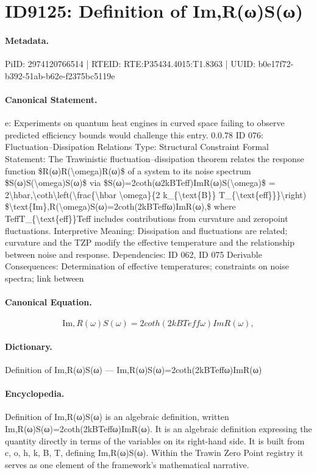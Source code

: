 \section*{ID9125: Definition of Im,R(ω)S(ω)}
\paragraph{Metadata.}
PiID: 2974120766514 | RTEID: RTE:P35434.4015:T1.8363 | UUID: b0e17f72-b392-51ab-b62e-f2375bc5119e

\paragraph{Canonical Statement.}
e: Experiments on quantum heat engines in curved space failing to observe predicted efficiency bounds would challenge this entry. 0.0.78 ID 076: Fluctuation–Dissipation Relations Type: Structural Constraint Formal Statement: The Trawinistic fluctuation–dissipation theorem relates the response function \$R(ω)R(\textbackslash{}omega)R(ω)\$ of a system to its noise spectrum \$S(ω)S(\textbackslash{}omega)S(ω)\$ via \$S(ω)=2coth(ω2kBTeff)ImR(ω)S(\textbackslash{}omega)\$ = 2\textbackslash{}hbar,\textbackslash{}coth\textbackslash{}left(\textbackslash{}frac\{\textbackslash{}hbar \textbackslash{}omega\}\{2 k\_\{\textbackslash{}text\{B\}\} T\_\{\textbackslash{}text\{eff\}\}\}\textbackslash{}right) \$\textbackslash{}text\{Im\},R(\textbackslash{}omega)S(ω)=2coth(2kBTeffω)ImR(ω),\$ where TeffT\_\{\textbackslash{}text\{eff\}\}Teff includes contributions from curvature and zeropoint fluctuations. Interpretive Meaning: Dissipation and fluctuations are related; curvature and the TZP modify the effective temperature and the relationship between noise and response. Dependencies: ID 062, ID 075 Derivable Consequences: Determination of effective temperatures; constraints on noise spectra; link between

\paragraph{Canonical Equation.}
\[
\text{Im},R(\omega)S(ω)=2coth(2kBTeffω)ImR(ω),
\]

\paragraph{Dictionary.}
Definition of Im,R(ω)S(ω) — Im,R(ω)S(ω)=2coth(2kBTeffω)ImR(ω)

\paragraph{Encyclopedia.}
Definition of Im,R(ω)S(ω) is an algebraic definition, written Im,R(ω)S(ω)=2coth(2kBTeffω)ImR(ω). It is an algebraic definition expressing the quantity directly in terms of the variables on its right-hand side. It is built from c, o, h, k, B, T, defining Im,R(ω)S(ω). Within the Trawin Zero Point registry it serves as one element of the framework's mathematical narrative.
